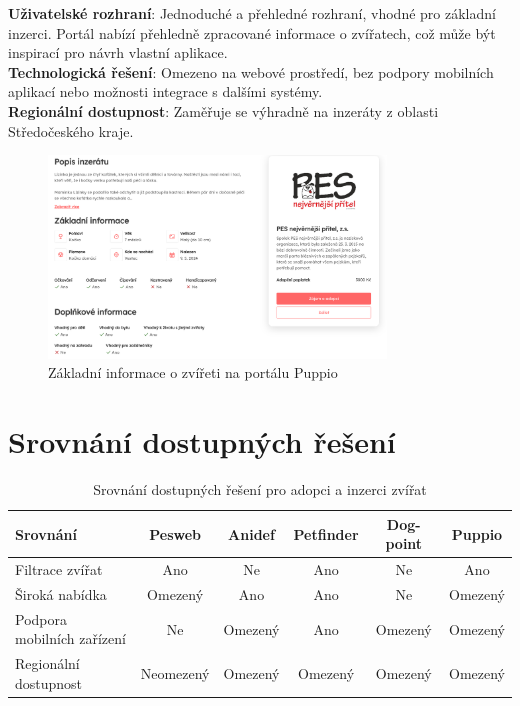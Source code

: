 \documentclass[12pt,a4paper]{report}
\begin{document}
\noindent \textbf{Uživatelské rozhraní}: Jednoduché a přehledné rozhraní, vhodné pro základní inzerci. Portál nabízí přehledně zpracované informace o zvířatech, což může být inspirací pro návrh vlastní aplikace.\\

\noindent \textbf{Technologická řešení}: Omezeno na webové prostředí, bez podpory mobilních aplikací nebo možnosti integrace s dalšími systémy.\\

\noindent \textbf{Regionální dostupnost}: Zaměřuje se výhradně na inzeráty z oblasti Středočeského kraje.\\

\begin{figure}[h!]
    \centering
    \includegraphics[width=0.8\textwidth]{img/puppio.png} %
    \caption{Základní informace o zvířeti na portálu Puppio} %
    \label{fig:basic-info-puppio} %
\end{figure}

\pagebreak

\section{Srovnání dostupných řešení}

\begin{table}[h!]
    \centering
    \begin{tabular}{|l|c|c|c|c|c|}
        \hline
        \textbf{Srovnání} & \textbf{Pesweb} & \textbf{Anidef} & \textbf{Petfinder} & \textbf{Dog-point} & \textbf{Puppio} \\ \hline
        Filtrace zvířat & Ano & Ne & Ano & Ne & Ano \\ \hline
        Široká nabídka & Omezený & Ano & Ano & Ne & Omezený \\ \hline
        Podpora mobilních zařízení & Ne & Omezený & Ano & Omezený & Omezený \\ \hline
        Regionální dostupnost & Neomezený & Omezený & Omezený & Omezený & Omezený \\ \hline
    \end{tabular}
    \caption{Srovnání dostupných řešení pro adopci a inzerci zvířat}
    \label{tab:srovnani-reseni}
\end{table}
\end{document}
